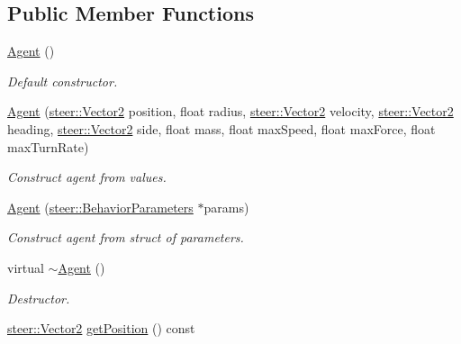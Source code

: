 \subsection*{Public Member Functions}
\begin{DoxyCompactItemize}
\item 
\hypertarget{classsteer_1_1_agent_a681c1d98ec267b9071b66b605f2042d3}{\hyperlink{classsteer_1_1_agent_a681c1d98ec267b9071b66b605f2042d3}{Agent} ()}\label{classsteer_1_1_agent_a681c1d98ec267b9071b66b605f2042d3}

\begin{DoxyCompactList}\small\item\em Default constructor. \end{DoxyCompactList}\item 
\hyperlink{classsteer_1_1_agent_af98ac1281c5f028278d9ab47cf5de03f}{Agent} (\hyperlink{structsteer_1_1_vector2}{steer\-::\-Vector2} position, float radius, \hyperlink{structsteer_1_1_vector2}{steer\-::\-Vector2} velocity, \hyperlink{structsteer_1_1_vector2}{steer\-::\-Vector2} heading, \hyperlink{structsteer_1_1_vector2}{steer\-::\-Vector2} side, float mass, float max\-Speed, float max\-Force, float max\-Turn\-Rate)
\begin{DoxyCompactList}\small\item\em Construct agent from values. \end{DoxyCompactList}\item 
\hyperlink{classsteer_1_1_agent_aadefcfb53b9349ea054718d4d8475e38}{Agent} (\hyperlink{structsteer_1_1_behavior_parameters}{steer\-::\-Behavior\-Parameters} $\ast$params)
\begin{DoxyCompactList}\small\item\em Construct agent from struct of parameters. \end{DoxyCompactList}\item 
\hypertarget{classsteer_1_1_agent_accf89ffc6938e5a62d12cdc69958ff7a}{virtual \hyperlink{classsteer_1_1_agent_accf89ffc6938e5a62d12cdc69958ff7a}{$\sim$\-Agent} ()}\label{classsteer_1_1_agent_accf89ffc6938e5a62d12cdc69958ff7a}

\begin{DoxyCompactList}\small\item\em Destructor. \end{DoxyCompactList}\item 
\hypertarget{classsteer_1_1_agent_acca7800c6bbe61f508c0ccf93fa1850e}{\hyperlink{structsteer_1_1_vector2}{steer\-::\-Vector2} \hyperlink{classsteer_1_1_agent_acca7800c6bbe61f508c0ccf93fa1850e}{get\-Position} () const }\label{classsteer_1_1_agent_acca7800c6bbe61f508c0ccf93fa1850e}


\end{DoxyCompactItemize}
